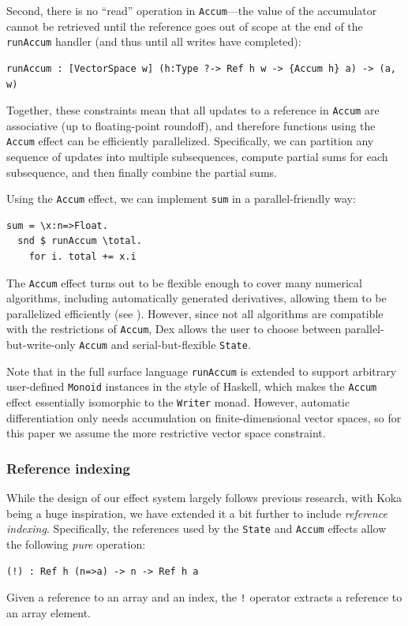 \documentclass[acmsmall,screen,nonacm]{acmart}
\newlength{\codeindent}
\newcommand{\ttt}[1]{\texttt{#1}}
\newcommand{\codelinesize}{\normalsize}
\begin{document}
Second, there is no ``read'' operation in \ttt{Accum}---the value of the accumulator cannot be retrieved until the reference goes out of scope at the end of the \ttt{runAccum} handler (and thus until all writes have completed):
\begin{Verbatim}[xleftmargin=\codeindent,fontsize=\codelinesize]
runAccum : [VectorSpace w] (h:Type ?-> Ref h w -> {Accum h} a) -> (a, w)
\end{Verbatim}

Together, these constraints mean that all updates to a reference in \ttt{Accum} are associative (up to floating-point roundoff), and therefore functions using the \texttt{Accum} effect can be efficiently parallelized.
Specifically, we can partition any sequence of updates into multiple subsequences, compute partial sums for each subsequence, and then finally combine the partial sums.

Using the \texttt{Accum} effect, we can implement \texttt{sum} in a parallel-friendly way:
\begin{Verbatim}[xleftmargin=\codeindent,fontsize=\small]
sum = \x:n=>Float.
  snd $ runAccum \total.
    for i. total += x.i
\end{Verbatim}

The \ttt{Accum} effect turns out to be flexible enough to cover many numerical algorithms, including automatically generated derivatives, allowing them to be parallelized efficiently (see ).
However, since not all algorithms are compatible with the restrictions of \texttt{Accum}, Dex allows the user to choose between parallel-but-write-only \texttt{Accum} and serial-but-flexible \texttt{State}.

Note that in the full surface language \texttt{runAccum} is extended to support arbitrary user-defined \texttt{Monoid} instances in the style of Haskell, which makes the \texttt{Accum} effect essentially isomorphic to the \texttt{Writer} monad.
However, automatic differentiation only needs accumulation on finite-dimensional vector spaces, so for this paper we assume the more restrictive vector space constraint.

\subsubsection{Reference indexing}
\label{sec:reference-slicing}

While the design of our effect system largely follows previous research, with Koka \cite{leijen2014koka} being a huge inspiration, we have extended it a bit further to include \emph{reference indexing}. Specifically, the references used by the {\tt State} and {\tt Accum} effects allow the following {\em pure} operation:
\begin{Verbatim}[xleftmargin=\codeindent,fontsize=\codelinesize]
(!) : Ref h (n=>a) -> n -> Ref h a
\end{Verbatim}
Given a reference to an array and an index, the \texttt{!} operator extracts a reference to an array element.
\end{document}
